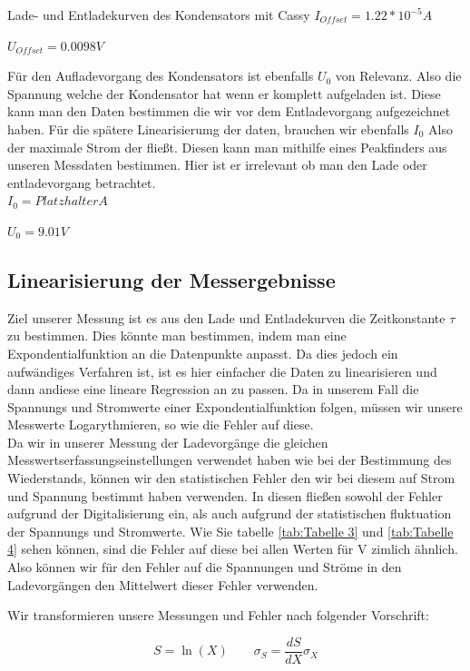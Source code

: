 \documentclass[twoside]{protokoll}
\begin{document}
\begin{aufgabe}{Lade- und Entladekurven des Kondensators mit Cassy}
$I_{Offset} = 1.22 * 10^{-5} A$

$U_{Offset} = 0.0098 V$

Für den Aufladevorgang des Kondensators ist ebenfalls $U_0$ von Relevanz. Also die Spannung welche der Kondensator hat wenn er komplett aufgeladen ist. 
Diese kann man den Daten bestimmen die wir vor dem Entladevorgang aufgezeichnet haben. 
Für die spätere Linearisierumg der daten, brauchen wir ebenfalls $I_0$ Also der maximale Strom der fließt. Diesen kann man mithilfe eines Peakfinders aus unseren Messdaten bestimmen.
Hier ist er irrelevant ob man den Lade oder entladevorgang betrachtet.\\

$ I_0 = Platzhalter A$

$ U_0 = 9.01 V $


\subsection{Linearisierung der Messergebnisse}

Ziel unserer Messung ist es aus den Lade und Entladekurven die Zeitkonstante $\tau$ zu bestimmen. 
Dies könnte man bestimmen, indem man eine Expondentialfunktion an die Datenpunkte  anpasst.
Da dies jedoch ein aufwändiges Verfahren ist, ist es hier einfacher die Daten zu linearisieren und dann andiese eine lineare Regression an zu passen. 
Da in unserem Fall die Spannungs und Stromwerte einer Expondentialfunktion folgen, müssen wir unsere Messwerte Logarythmieren, so wie die Fehler auf diese.\\

Da wir in unserer Messung der Ladevorgänge die gleichen Messwertserfassungseinstellungen verwendet haben wie bei der Bestimmung des Wiederstands, können wir den statistischen Fehler den wir bei diesem auf Strom und Spannung bestimmt haben verwenden. 
In diesen fließen sowohl der Fehler aufgrund der Digitalisierung ein, als auch aufgrund der statistischen fluktuation der Spannungs und Stromwerte.
Wie Sie tabelle  \ref{tab:Tabelle 3} und \ref{tab:Tabelle 4} sehen können, sind die Fehler auf diese bei allen Werten für V zimlich ähnlich. 
Also können wir für den Fehler auf die Spannungen und Ströme in den Ladevorgängen den Mittelwert dieser Fehler verwenden.

Wir transformieren unsere Messungen und Fehler nach folgender Vorschrift:

\begin{equation}
	S = \ln(X) \qquad \sigma_S = \frac{dS}{dX} \sigma_X
\end{equation}


\end{aufgabe}
\end{document}

